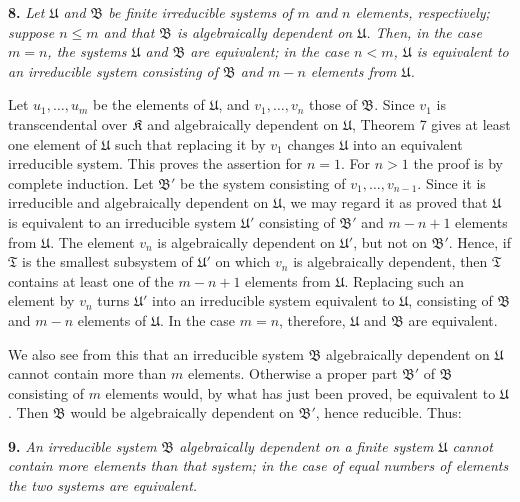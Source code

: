 \textbf{8.} \emph{Let $\mathfrak U$ and $\mathfrak B$ be finite irreducible systems of $m$ and $n$ elements, respectively; suppose $n\leq m$ and that $\mathfrak B$ is algebraically dependent on $\mathfrak U$. Then, in the case $m=n$, the systems $\mathfrak U$ and $\mathfrak B$ are equivalent; in the case $n<m$, $\mathfrak U$ is equivalent to an irreducible system consisting of $\mathfrak B$ and $m-n$ elements from $\mathfrak U$.}

Let $u_1,\ldots,u_m$ be the elements of $\mathfrak U$, and $v_1,\ldots,v_n$ those of $\mathfrak B$. Since $v_1$ is transcendental over $\mathfrak K$ and algebraically dependent on $\mathfrak U$, Theorem 7 gives at least one element of $\mathfrak U$ such that replacing it by $v_1$ changes $\mathfrak U$ into an equivalent irreducible system. This proves the assertion for $n=1$. For $n>1$ the proof is by complete induction. Let $\mathfrak B'$ be the system consisting of $v_1,\ldots,v_{n-1}$. Since it is irreducible and algebraically dependent on $\mathfrak U$, we may regard it as proved that $\mathfrak U$ is equivalent to an irreducible system $\mathfrak U'$ consisting of $\mathfrak B'$ and $m-n+1$ elements from $\mathfrak U$. The element $v_n$ is algebraically dependent on $\mathfrak U'$, but not on $\mathfrak B'$. Hence, if $\mathfrak T$ is the smallest subsystem of $\mathfrak U'$ on which $v_n$ is algebraically dependent, then $\mathfrak T$ contains at least one of the $m-n+1$ elements from $\mathfrak U$. Replacing such an element by $v_n$ turns $\mathfrak U'$ into an irreducible system equivalent to $\mathfrak U$, consisting of $\mathfrak B$ and $m-n$ elements of $\mathfrak U$. In the case $m=n$, therefore, $\mathfrak U$ and $\mathfrak B$ are equivalent.

We also see from this that an irreducible system $\mathfrak B$ algebraically dependent on $\mathfrak U$ cannot contain more than $m$ elements. Otherwise a proper part $\mathfrak B'$ of $\mathfrak B$ consisting of $m$ elements would, by what has just been proved, be equivalent to $\mathfrak U$. Then $\mathfrak B$ would be algebraically dependent on $\mathfrak B'$, hence reducible. Thus:

\textbf{9.} \emph{An irreducible system $\mathfrak B$ algebraically dependent on a finite system $\mathfrak U$ cannot contain more elements than that system; in the case of equal numbers of elements the two systems are equivalent.}
